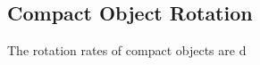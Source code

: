 {\color{orange}

\subsection{Compact Object Rotation}

The rotation rates of compact objects are d

}